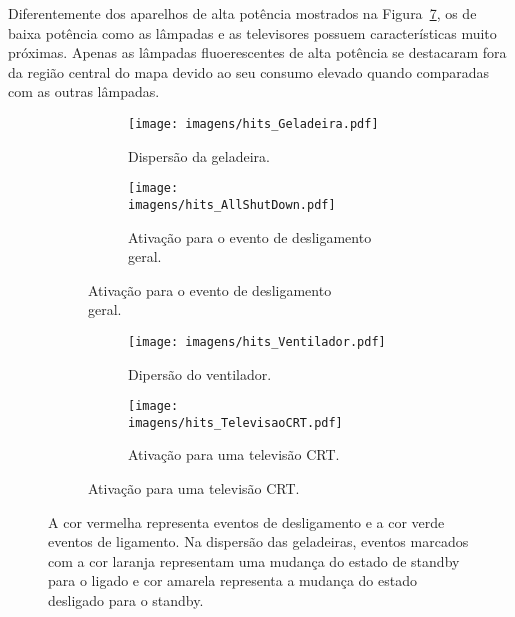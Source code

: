Diferentemente dos aparelhos de alta potência mostrados na
Figura~\ref{fig:baixapot}, os de baixa potência como as lâmpadas e as
televisores possuem características muito próximas. Apenas as lâmpadas
fluoerescentes de alta potência se destacaram fora da região central
do mapa devido ao seu consumo elevado quando comparadas com as outras
lâmpadas.

\begin{figure}[h!tb]
  \begin{center}
    \begin{subfigure}[c]{\textwidth}
      \begin{subfigure}[c]{8cm}
        \texttt{[image: imagens/hits\_Geladeira.pdf]}
        \caption{Dispersão da geladeira.}
        \label{fig:hits_geladeira}
      \end{subfigure}
      \begin{subfigure}[c]{8cm}
        \texttt{[image: imagens/hits\_AllShutDown.pdf]}
        \caption{Ativação para o evento de desligamento\\ geral.}
        \label{fig:hits_allshutdown}
      \end{subfigure}
    \end{subfigure}

    \begin{subfigure}[c]{\textwidth}
      \begin{subfigure}[c]{8cm}
        \texttt{[image: imagens/hits\_Ventilador.pdf]}
        \caption{Dipersão do ventilador.}
        \label{fig:hits_ventilador}
      \end{subfigure}
      \begin{subfigure}[c]{8cm}
        \texttt{[image: imagens/hits\_TelevisaoCRT.pdf]}
        \caption{Ativação para uma televisão CRT.}
        \label{fig:televisao_CRT}
      \end{subfigure}
    \end{subfigure}
  \end{center}
\caption{A cor vermelha representa eventos de desligamento e a cor
verde eventos de ligamento. Na dispersão das geladeiras, eventos
marcados com a cor laranja representam uma mudança do estado de
standby para o ligado e cor amarela representa a mudança do estado
desligado para o standby.}
\label{fig:baixapot}
\end{figure}

